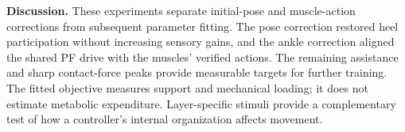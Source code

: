 \noindent\textbf{Discussion.}
These experiments separate initial-pose and muscle-action corrections from subsequent parameter fitting. The pose correction restored heel participation without increasing sensory gains, and the ankle correction aligned the shared PF drive with the muscles' verified actions. The remaining assistance and sharp contact-force peaks provide measurable targets for further training. The fitted objective measures support and mechanical loading; it does not estimate metabolic expenditure. Layer-specific stimuli provide a complementary test of how a controller's internal organization affects movement.
